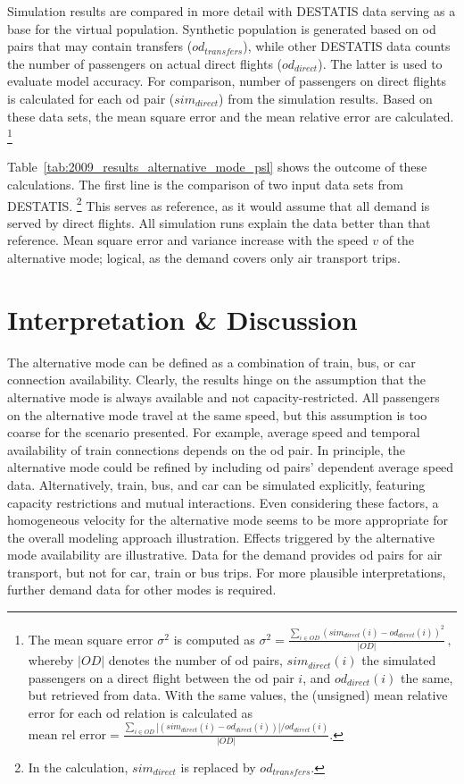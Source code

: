 Simulation results are compared in more detail with DESTATIS data serving as a base for the virtual population.  
Synthetic population is generated based on \gls{od} pairs that may contain transfers ($od_{transfers}$), 
while other DESTATIS data counts the number of passengers on actual direct flights ($od_{direct}$). %
The latter is used to evaluate model accuracy.
For comparison, number of passengers on direct flights is calculated for each \gls{od} pair ($sim_{direct}$) from the simulation results.
Based on these data sets, the mean square error and the mean relative error are calculated.%
\footnote{
The mean square error $\sigma^2$ is computed as
	$\sigma^2 = \frac{\sum_{i \in OD} (sim_{direct}(i) - od_{direct}(i))^2}{|OD|} \, , $
whereby $|OD|$ denotes the number of \gls{od} pairs, $sim_{direct}(i)$ the simulated passengers on a direct flight between the \gls{od} pair $i$, and $od_{direct}(i)$ the same, but retrieved from data.  
With the same values, the (unsigned) mean relative error for each \gls{od} relation is calculated as
$
\mbox{mean rel error} = \frac{\sum_{i \in OD} |(sim_{direct}(i) - od_{direct}(i))|/ od_{direct}(i)}{|OD|}.
$
} 

Table~\ref{tab:2009_results_alternative_mode_psl} shows the outcome of these calculations. 
The first line is the comparison of two input data sets from DESTATIS.%
\footnote{In the calculation, $sim_{direct}$ is replaced by $od_{transfers}$.} 
This serves as reference, as it would assume that all demand is served by direct flights.
All simulation runs explain the data better than that reference.
Mean square error and variance increase with the speed $v$ of the alternative mode;  
logical, as the demand covers only air transport trips. 

\section{Interpretation \& Discussion}
\label{sec:air_rail_discussion}
The alternative mode can be defined as a combination of train, bus, or car connection availability. 
Clearly, the results hinge on the assumption that the alternative mode is always available and not capacity-restricted.  
All passengers on the alternative mode travel at the same speed, but 
this assumption is too coarse for the scenario presented. 
For example, average speed and temporal availability of train connections depends on the \gls{od} pair. 
In principle, the alternative mode could be refined by including \gls{od} pairs' dependent average speed data. 
Alternatively, train, bus, and car can be simulated explicitly, featuring capacity restrictions and mutual interactions. 
Even considering these factors, a homogeneous velocity for the alternative mode seems to be more appropriate for the overall modeling approach illustration. 
Effects triggered by the alternative mode availability are illustrative. 
Data for the demand provides \gls{od} pairs for air transport, but not for car, train or bus trips.  
For more plausible interpretations, further demand data for other modes is required. 

